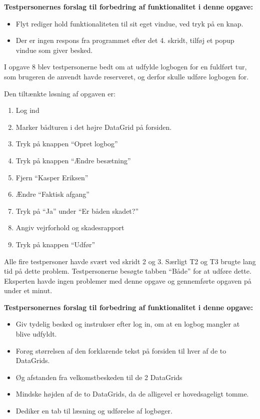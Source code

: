 \textbf{Testpersonernes forslag til forbedring af funktionalitet i denne opgave:}
\begin{itemize}
    \item Flyt rediger hold funktionaliteten til sit eget vindue, ved tryk på en knap.
    \item Der er ingen respons fra programmet efter det 4. skridt, tilføj et popup vindue som giver besked.
\end{itemize}


I opgave 8 blev testpersonerne bedt om at udfylde logbogen for en fuldført tur, som brugeren de anvendt havde reserveret, og derfor skulle udføre logbogen for.

Den tiltænkte løsning af opgaven er:
\begin{enumerate}
    \item Log ind
    \item Marker bådturen i det højre DataGrid på forsiden.
    \item Tryk på knappen ``Opret logbog''
    \item Tryk på knappen ``Ændre besætning''
    \item Fjern ``Kasper Eriksen''
    \item Ændre ``Faktisk afgang''
    \item Tryk på ``Ja'' under ``Er båden skadet?''
    \item Angiv vejrforhold og skadesrapport
    \item Tryk på knappen ``Udfør''
\end{enumerate}

Alle fire testpersoner havde svært ved skridt 2 og 3.
Særligt T2 og T3 brugte lang tid på dette problem.
Testpersonerne besøgte tabben ``Både'' for at udføre dette. 
Eksperten havde ingen problemer med denne opgave og gennemførte opgaven på under et minut.

\textbf{Testpersonernes forslag til forbedring af funktionalitet i denne opgave:}
\begin{itemize}
    \item Giv tydelig besked og instrukser efter log in, om at en logbog mangler at blive udfyldt.
    \item Forøg størrelsen af den forklarende tekst på forsiden til hver af de to DataGrids.
    \item Øg afstanden fra velkomstbeskeden til de 2 DataGrids
    \item Mindske højden af de to DataGrids, da de alligevel er hovedsageligt tomme. 
    \item Dediker en tab til læsning og udførelse af logbøger. 
\end{itemize}

